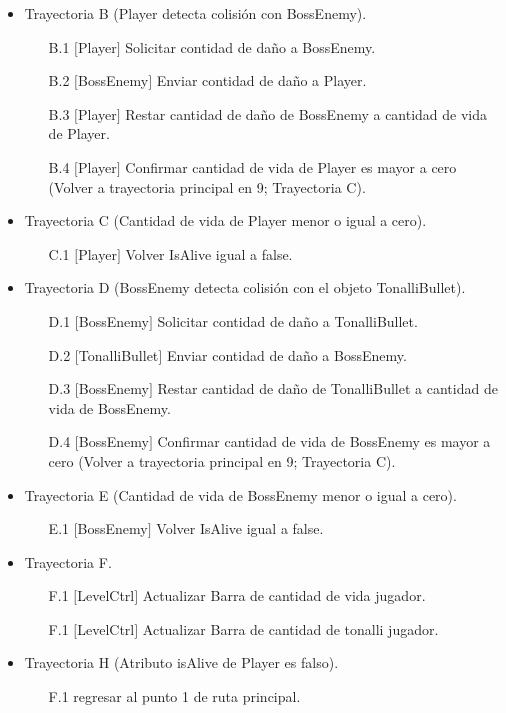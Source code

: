 \begin{itemize}
		\item Trayectoria B (Player detecta colisión con BossEnemy).
			\begin{enumerate}
				\item[{B.}1] $\lbrack$Player$\rbrack$ Solicitar contidad de daño a BossEnemy.
				\item[{B.}2] $\lbrack$BossEnemy$\rbrack$ Enviar contidad de daño a Player.
				\item[{B.}3] $\lbrack$Player$\rbrack$ Restar cantidad de daño de BossEnemy a
				cantidad de vida de Player.
				\item[{B.}4] $\lbrack$Player$\rbrack$ Confirmar cantidad de vida de Player es 
				mayor a cero (Volver a trayectoria principal en 9; Trayectoria C).
			\end{enumerate}
		
		\item Trayectoria C (Cantidad de vida de Player menor o igual a cero).
			\begin{enumerate}
				\item[{C.}1] $\lbrack$Player$\rbrack$ Volver IsAlive igual a false.
			\end{enumerate}
			
		\item Trayectoria D (BossEnemy detecta colisión con el objeto TonalliBullet).
			\begin{enumerate}
				\item[{D.}1] $\lbrack$BossEnemy$\rbrack$ Solicitar contidad de daño a TonalliBullet.
				\item[{D.}2] $\lbrack$TonalliBullet$\rbrack$ Enviar contidad de daño a BossEnemy.
				\item[{D.}3] $\lbrack$BossEnemy$\rbrack$ Restar cantidad de daño de TonalliBullet a
				cantidad de vida de BossEnemy.
				\item[{D.}4] $\lbrack$BossEnemy$\rbrack$ Confirmar cantidad de vida de BossEnemy es 
				mayor a cero (Volver a trayectoria principal en 9; Trayectoria C).
			\end{enumerate}
			
		\item Trayectoria E (Cantidad de vida de BossEnemy menor o igual a cero).
			\begin{enumerate}
				\item[{E.}1] $\lbrack$BossEnemy$\rbrack$ Volver IsAlive igual a false.
			\end{enumerate}
			
		\item Trayectoria F.
			\begin{enumerate}
				\item[{F.}1] $\lbrack$LevelCtrl$\rbrack$ Actualizar Barra de cantidad de 
				vida jugador. 
				\item[{F.}1] $\lbrack$LevelCtrl$\rbrack$ Actualizar Barra de cantidad de 
				tonalli jugador. 
			\end{enumerate}
		
		\item Trayectoria H (Atributo isAlive de Player es falso).
			\begin{enumerate}
				\item[{F.}1] regresar al punto 1 de ruta principal. 
			\end{enumerate}
	\end{itemize}	